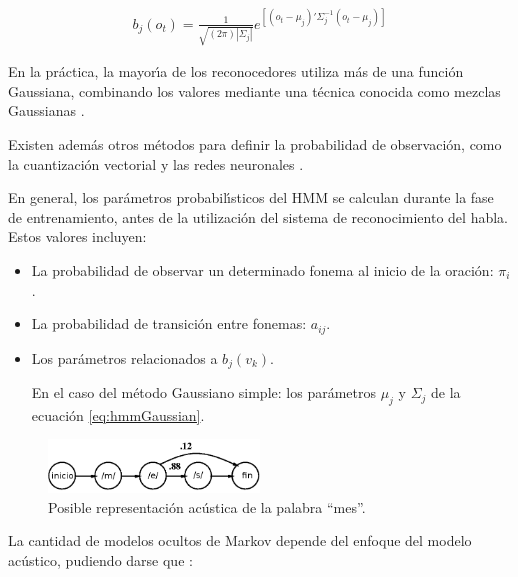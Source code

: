 \begin{enumerate}[A)]
	\begin{align}
    	b_j(o_t) = \frac{1}{\sqrt{(2\pi)|\Sigma_j|}}e^{[(o_t-\mu_j)'\Sigma_j^{-1}(o_t-\mu_j)]}\label{eq:hmmGaussian}
	\end{align}

	En la pr\'actica, la mayor{\'\i}a de los reconocedores utiliza m\'as de una funci\'on Gaussiana, combinando
	los valores mediante una t\'ecnica conocida como mezclas Gaussianas \cite{huang-handbook10}.

	Existen adem\'as otros m\'etodos para definir la probabilidad de observaci\'on, como la cuantizaci\'on
	vectorial \cite{Burton1983} y las redes neuronales \cite{KristineApplying1995}.

	En general, los par\'ametros probabil{\'\i}sticos del HMM se calculan durante la fase de entrenamiento,
	antes de la utilizaci\'on del sistema de reconocimiento del habla. Estos valores incluyen:

	\begin{itemize}
		\item La probabilidad de observar un determinado fonema al inicio de la oraci\'on: $\pi_i$.
		\item La probabilidad de transici\'on entre fonemas: $a_{ij}$.
		\item Los par\'ametros relacionados a $b_j(v_k)$. 

		En el caso del m\'etodo Gaussiano simple: los par\'ametros $\mu_j$ y $\Sigma_j$ de la 
		ecuaci\'on \ref{eq:hmmGaussian}.
	\end{itemize}

\end{enumerate}

\begin{figure}[H] 
\centering
\includegraphics[width=0.5\textwidth]{./graphics/hmm_palabra.png}
\caption{Posible representaci\'on ac\'ustica de la palabra ``mes''. }
\label{figure:hmm-palabra}
\end{figure}

La cantidad de modelos ocultos de Markov depende del enfoque del modelo ac\'ustico, pudiendo darse 
que \cite{Livescu2012}:

